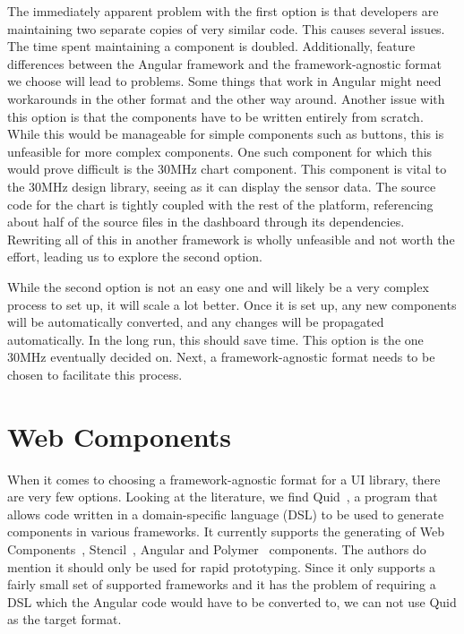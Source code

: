 The immediately apparent problem with the first option is that developers are maintaining two separate copies of very similar code. This causes several issues. The time spent maintaining a component is doubled. Additionally, feature differences between the Angular framework and the framework-agnostic format we choose will lead to problems. Some things that work in Angular might need workarounds in the other format and the other way around. Another issue with this option is that the components have to be written entirely from scratch. While this would be manageable for simple components such as buttons, this is unfeasible for more complex components. One such component for which this would prove difficult is the 30MHz chart component. This component is vital to the 30MHz design library, seeing as it can display the sensor data. The source code for the chart is tightly coupled with the rest of the platform, referencing about half of the source files in the dashboard through its dependencies. Rewriting all of this in another framework is wholly unfeasible and not worth the effort, leading us to explore the second option.

While the second option is not an easy one and will likely be a very complex process to set up, it will scale a lot better. Once it is set up, any new components will be automatically converted, and any changes will be propagated automatically. In the long run, this should save time. This option is the one 30MHz eventually decided on. Next, a framework-agnostic format needs to be chosen to facilitate this process.

\section{Web Components}\label{sec:bg:webcomponents}
When it comes to choosing a framework-agnostic format for a UI library, there are very few options. Looking at the literature, we find Quid~\cite{molina2019quid}, a program that allows code written in a domain-specific language (DSL) to be used to generate components in various frameworks. It currently supports the generating of Web Components~, Stencil~, Angular and Polymer~ components. The authors do mention it should only be used for rapid prototyping. Since it only supports a fairly small set of supported frameworks and it has the problem of requiring a DSL which the Angular code would have to be converted to, we can not use Quid as the target format.

